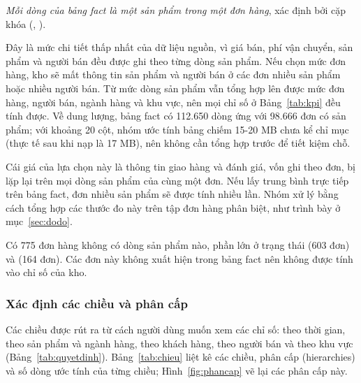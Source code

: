 \begin{center}
\textit{Mỗi dòng của bảng fact là một sản phẩm trong một đơn hàng}, xác định bởi cặp khóa (, ).
\end{center}

Đây là mức chi tiết thấp nhất của dữ liệu nguồn, vì giá bán, phí vận chuyển, sản phẩm và người bán đều được ghi theo từng dòng sản phẩm. Nếu chọn mức đơn hàng, kho sẽ mất thông tin sản phẩm và người bán ở các đơn nhiều sản phẩm hoặc nhiều người bán. Từ mức dòng sản phẩm vẫn tổng hợp lên được mức đơn hàng, người bán, ngành hàng và khu vực, nên mọi chỉ số ở Bảng~\ref{tab:kpi} đều tính được. Về dung lượng, bảng fact có 112.650 dòng ứng với 98.666 đơn có sản phẩm; với khoảng 20 cột, nhóm ước tính bảng chiếm 15-20 MB chưa kể chỉ mục (thực tế sau khi nạp là 17 MB), nên không cần tổng hợp trước để tiết kiệm chỗ.

Cái giá của lựa chọn này là thông tin giao hàng và đánh giá, vốn ghi theo đơn, bị lặp lại trên mọi dòng sản phẩm của cùng một đơn. Nếu lấy trung bình trực tiếp trên bảng fact, đơn nhiều sản phẩm sẽ được tính nhiều lần. Nhóm xử lý bằng cách tổng hợp các thước đo này trên tập đơn hàng phân biệt, như trình bày ở mục~\ref{sec:dodo}.

Có 775 đơn hàng không có dòng sản phẩm nào, phần lớn ở trạng thái  (603 đơn) và  (164 đơn). Các đơn này không xuất hiện trong bảng fact nên không được tính vào chỉ số của kho.

\subsubsection{Xác định các chiều và phân cấp}

Các chiều được rút ra từ cách người dùng muốn xem các chỉ số: theo thời gian, theo sản phẩm và ngành hàng, theo khách hàng, theo người bán và theo khu vực (Bảng~\ref{tab:quyetdinh}). Bảng~\ref{tab:chieu} liệt kê các chiều, phân cấp (hierarchies) và số dòng ước tính của từng chiều; Hình~\ref{fig:phancap} vẽ lại các phân cấp này.


